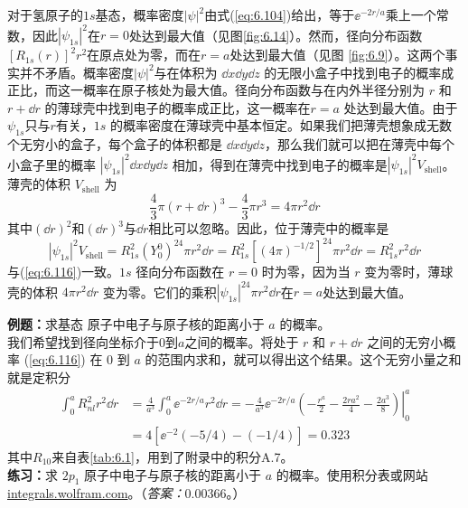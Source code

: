     对于氢原子的$1s$基态，概率密度$\left|\psi\right|^2$由式(\ref{eq:6.104})给出，等于$\ee ^{-2r/a}$乘上一个常数，因此$\left|\psi_{1s}\right|^2$在$r=0$处达到最大值（见图\ref{fig:6.14}）。然而，径向分布函数$\left[R_{1s}\left(r\right)\right]^2r^2$在原点处为零，而在$r=a$处达到最大值（见图 \ref{fig:6.9}）。这两个事实并不矛盾。概率密度$\left|\psi\right|^2$与在体积为 $\dd x\dd y\dd z$ 的无限小盒子中找到电子的概率成正比，而这一概率在原子核处为最大值。径向分布函数与在内外半径分别为 $r$ 和 $r +\dd r$ 的薄球壳中找到电子的概率成正比，这一概率在$r = a$ 处达到最大值。由于$\psi_{1s}$只与$r$有关，$1s$ 的概率密度在薄球壳中基本恒定。如果我们把薄壳想象成无数个无穷小的盒子，每个盒子的体积都是 $\dd x\dd y\dd z$，那么我们就可以把在薄壳中每个小盒子里的概率 $\left|\psi_{1s}\right|^2\dd x\dd y\dd z$ 相加，得到在薄壳中找到电子的概率是$\left|\psi_{1s}\right|^2V_{\text{shell}}$。薄壳的体积 $V_{\text{shell}}$ 为
    \begin{equation*}
        \frac{4}{3}\pi\left(r+\dd r\right)^3 - \frac{4}{3}\pi r^3 = 4\pi r^2\dd r
    \end{equation*}
    其中$\left(\dd r\right)^2$和$\left(\dd r\right)^3$与$\dd r$相比可以忽略。因此，位于薄壳中的概率是
    \begin{equation*}
        \left|\psi_{1s}\right|^2V_{\text{shell}} = R_{1s}^2\left(Y_0^0\right)^24\pi r^2\dd r = R_{1s}^2\left[\left(4\pi\right)^{-1/2}\right]^24\pi r^2\dd r = R_{1s}^2r^2\dd r
    \end{equation*}
    与(\ref{eq:6.116})一致。$1s$ 径向分布函数在 $r =0$ 时为零，因为当 $r$ 变为零时，薄球壳的体积 $4\pi r^2\dd r$ 变为零。它们的乘积$\left|\psi_{1s}\right|^24\pi r^2\dd r$在$r=a$处达到最大值。

    \begin{examplebox}
        \textbf{例题：}求基态  原子中电子与原子核的距离小于 $a$ 的概率。
        \\

        我们希望找到径向坐标介于$0$到$a$之间的概率。将处于 $r$ 和 $r +\dd r$ 之间的无穷小概率 (\ref{eq:6.116}) 在 $0$ 到 $a$ 的范围内求和，就可以得出这个结果。这个无穷小量之和就是定积分
        \begin{equation*}
            \begin{aligned}
                \int_{0}^{a}R_{nl}^2r^2\dd r & = \frac{4}{a^3}\int_{0}^{a}\ee ^{-2r/a}r^2\dd r  = \left. -\frac{4}{a^3}\ee ^{-2r/a}\left(-\frac{r^a}{2} - \frac{2ra^2}{4} - \frac{2a^3}{8}\right)\right|_{0}^{a}\\
                & = 4\left[\ee ^{-2}\left(-5/4\right)- \left(-1/4\right)\right] = 0.323          
            \end{aligned}
        \end{equation*}
        其中$R_{10}$来自表\ref{tab:6.1}，用到了附录中的积分A.7。
        \\

        \textbf{练习：}求 $2p_1$  原子中电子与原子核的距离小于 $a$ 的概率。使用积分表或网站\url{integrals.wolfram.com}。（\textit{答案：}$0.00366$。）
    \end{examplebox}

